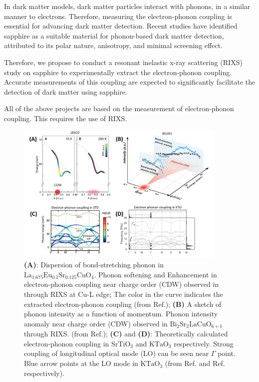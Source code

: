 \documentclass[11pt]{article}
\begin{document}
In dark matter models, dark matter particles interact with phonons, in a similar manner to electrons\cite{griffin_directional_2018}. Therefore, measuring the electron-phonon coupling is essential for advancing dark matter detection. Recent studies have identified sapphire as a suitable material for phonon-based dark matter detection, attributed to its polar nature, anisotropy, and minimal screening effect\cite{griffin_directional_2018}.
  
Therefore, we propose to conduct a resonant inelastic x-ray scattering (RIXS) study on sapphire to experimentally extract the electron-phonon coupling. Accurate measurements of this coupling are expected to significantly facilitate the detection of dark matter using sapphire.

All of the above projects are based on the measurement of electron-phonon coupling. This requires the use of RIXS.
\begin{figure}[!t]
    \centering
    \includegraphics[width=0.9\textwidth]{figures/figure1.jpg}
    \caption{\textbf{(A)}: Dispersion of bond-stretching phonon in $\mathrm{La_{1.675}Eu_{0.2}Sr_{0.125}CuO_{4}}$. Phonon softening and Enhancement in electron-phonon coupling near charge order (CDW) observed in  through RIXS at Cu-L edge; The color in the curve indicates the extracted electron-phonon coupling (from Ref.\cite{wang_charge_2021}); \textbf{(B)} A sketch of phonon intensity as a function of momentum. Phonon intensity anomaly near charge order (CDW) observed in $\mathrm{Bi_2Sr_2LaCuO_{6+\delta}}$ through RIXS.  (from Ref.\cite{li_multiorbital_2020}); \textbf{(C)} and \textbf{(D)}: Theoretically calculated electron-phonon coupling in $\mathrm{SrTiO_3}$ and $\mathrm{KTaO_3}$ respectively. Strong coupling of longitudinal optical mode (LO) can be seen near $\Gamma$ point. Blue arrow points at the LO mode in  $\mathrm{KTaO_3}$ (from Ref.\cite{zhou_electron-phonon_2018} and Ref.\cite{esswein_first-principles_2023} respectively).}  
    \label{first_figure}
\end{figure}
\end{document}
